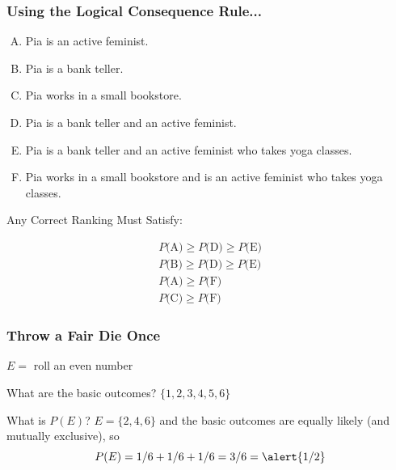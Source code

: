 \documentclass{beamer}
\begin{document}
\begin{frame}
\frametitle{Using the Logical Consequence Rule...}
 \footnotesize
		\begin{enumerate}[(A)]
			\item Pia is an active feminist.
			\item Pia is a bank teller.
			\item Pia works in a small bookstore.
			\item Pia is a bank teller and an active feminist.
			\item Pia is a bank teller and an active feminist who takes yoga classes.
			\item Pia works in a small bookstore and is an active feminist who takes yoga classes.
		\end{enumerate}
\begin{alertblock}{Any Correct Ranking Must Satisfy:}\end{alertblock}
\begin{eqnarray*}
P\mbox{(A)}\geq P\mbox{(D)}\geq P\mbox{(E)}\\
P\mbox{(B)}\geq P\mbox{(D)}\geq P\mbox{(E)}\\
P\mbox{(A)}\geq P\mbox{(F)}\\
P\mbox{(C)}\geq P\mbox{(F)}
\end{eqnarray*}
\end{frame}
\begin{frame}
\frametitle{Throw a Fair Die Once}
\begin{block}{$E = $ roll an even number}
\end{block}
\begin{block}{What are the basic outcomes?}
$\{1,2,3,4,5,6\}$
\end{block}\pause
\begin{block}{What is $P(E)$? }\pause
$E = \{2,4,6\}$ and the basic outcomes are equally likely (and mutually exclusive), so 
	$$P(E) = 1/6 + 1/6 + 1/6 = 3/6 = \alert{1/2}$$
\end{block}

\end{frame}
\end{document}
